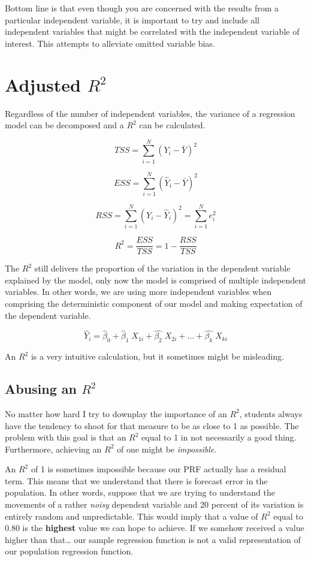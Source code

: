 \documentclass[
]{book}
\begin{document}
Bottom line is that even though you are concerned with the results from a particular independent variable, it is important to try and include all independent variables that might be correlated with the independent variable of interest. This attempts to alleviate omitted variable bias.

\hypertarget{adjusted-r2}{%
\section{\texorpdfstring{Adjusted \(R^2\)}{Adjusted R\^{}2}}\label{adjusted-r2}}

Regardless of the number of independent variables, the variance of a regression model can be decomposed and a \(R^2\) can be calculated.

\[TSS = \sum^{N}_{i=1}(Y_i - \bar{Y})^2\]

\[ESS = \sum^{N}_{i=1}(\hat{Y}_i - \bar{Y})^2\]

\[RSS = \sum^{N}_{i=1}(Y_i - \hat{Y}_i)^2 = \sum^{N}_{i=1}e_i^2\]

\[R^2 = \frac{ESS}{TSS} = 1 - \frac{RSS}{TSS}\]

The \(R^2\) still delivers the proportion of the variation in the dependent variable explained by the model, only now the model is comprised of multiple independent variables. In other words, we are using more independent variables when comprising the deterministic component of our model and making expectation of the dependent variable.

\[\hat{Y}_i = \hat{\beta}_0+\hat{\beta}_1\;X_{1i}+\hat{\beta_2}\;X_{2i}+...+\hat{\beta_k}\;X_{ki}\]

An \(R^2\) is a very intuitive calculation, but it sometimes might be misleading.

\hypertarget{abusing-an-r2}{%
\subsection{\texorpdfstring{Abusing an \(R^2\)}{Abusing an R\^{}2}}\label{abusing-an-r2}}

No matter how hard I try to downplay the importance of an \(R^2\), students always have the tendency to shoot for that measure to be as close to 1 as possible. The problem with this goal is that an \(R^2\) equal to 1 in not necessarily a good thing. Furthermore, achieving an \(R^2\) of one might be \emph{impossible}.

An \(R^2\) of 1 is sometimes impossible because our PRF actually has a residual term. This means that we understand that there is forecast error in the population. In other words, suppose that we are trying to understand the movements of a rather \emph{noisy} dependent variable and 20 percent of its variation is entirely random and unpredictable. This would imply that a value of \(R^2\) equal to \(0.80\) is the \textbf{highest} value we can hope to achieve. If we somehow received a value higher than that\ldots{} our sample regression function is not a valid representation of our population regression function.
\end{document}
